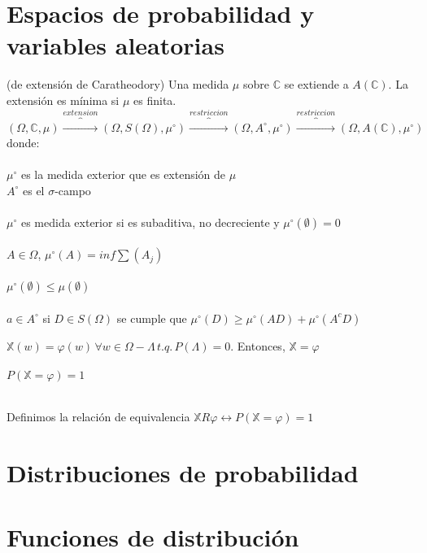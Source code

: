 \documentclass[12pt,a4paper]{book}
\begin{document}
\section{Espacios de probabilidad y variables aleatorias}

\begin{theorem} (de extensión de Caratheodory) 
Una medida $\mu$ sobre $\mathbb{C}$ se extiende a $A(\mathbb{C})$. La extensión es mínima si $\mu$ es finita.
$$(\Omega,\mathbb{C},\mu)\overbrace{\longrightarrow}^{extension}(\Omega,S(\Omega),\mu^\circ)\overbrace{\longrightarrow}^{restriccion}(\Omega,A^\circ,\mu^\circ)\overbrace{\longrightarrow}^{restriccion}(\Omega,A(\mathbb{C}),\mu^\circ)$$
donde:\\\\
$\mu^\circ$ es la medida exterior que es extensión de $\mu$\\
$A^\circ$ es el $\sigma$-campo\\\\
$\mu^\circ$ es medida exterior si es subaditiva, no decreciente y $\mu^\circ(\emptyset)=0$
\\\\
$A\in \Omega$, $\mu^\circ(A)=inf\displaystyle\sum(A_j)$\\\\
$\mu^\circ(\emptyset)\leq\mu(\emptyset)$\\\\
$a\in A^\circ$ si $D\in S(\Omega)$ se cumple que $\mu^\circ(D)\geq\mu^\circ(AD)+\mu^\circ(A^c D)$
\end{theorem}

\begin{lemma} 
$\mathbb{X}(w)=\varphi(w)\,\forall w \in \Omega - \Lambda\, t.q.\, P(\Lambda)=0$. Entonces, $\mathbb{X}=\varphi$ \\\\
$P(\mathbb{X}=\varphi)=1$\\\\
\end{lemma}
Definimos la relación de equivalencia $\mathbb{X}R\varphi\leftrightarrow P(\mathbb{X}=\varphi)=1$
\section{Distribuciones de probabilidad}
\section{Funciones de distribución}
\end{document}
